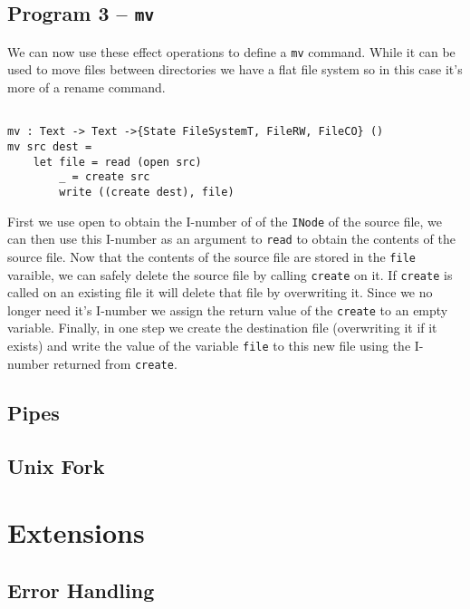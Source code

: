 \documentclass[logo,bsc,singlespacing,parskip]{infthesis}
\begin{document}
\begin{tcolorbox}[colback=gray!10, colframe=black, arc=0pt, outer arc=0pt]
  \section*{Program 3 -- \texttt{mv}}

  We can now use these effect operations to define a \texttt{mv} command. While
  it can be used to move files between directories we have a flat file system
  so in this case it's more of a rename command.

  \begin{lstlisting}[language=unison]

mv : Text -> Text ->{State FileSystemT, FileRW, FileCO} ()
mv src dest = 
    let file = read (open src)
        _ = create src
        write ((create dest), file)

  \end{lstlisting}

  First we use open to obtain the I-number of of the \texttt{INode} of the
  source file, we can then use this I-number as an argument to \texttt{read} to
  obtain the contents of the source file. Now that the contents of the source
  file are stored in the \texttt{file} varaible, we can safely delete the
  source file by calling \texttt{create} on it. If \texttt{create} is called on
  an existing file it will delete that file by overwriting it. Since we no
  longer need it's I-number we assign the return value of the \texttt{create}
  to an empty variable. Finally, in one step we create the destination file
  (overwriting it if it exists) and write the value of the variable
  \texttt{file} to this new file using the I-number returned from
  \texttt{create}.

\end{tcolorbox}

\section{Pipes}

\section{Unix Fork}

\chapter{Extensions}

\section{Error Handling}
\end{document}
